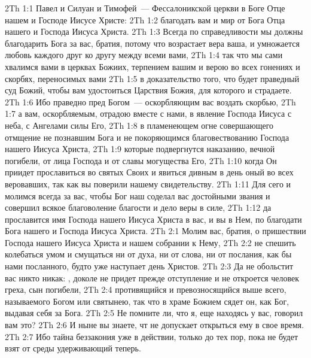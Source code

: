 \vs 2Th 1:1 Павел и Силуан и Тимофей~--- Фессалоникской церкви в Боге Отце нашем и Господе Иисусе Христе:
\vs 2Th 1:2 благодать вам и мир от Бога Отца нашего и Господа Иисуса Христа.
\rsbpar\vs 2Th 1:3 Всегда по справедливости мы должны благодарить Бога за вас, братия, потому что возрастает вера ваша, и умножается любовь каждого друг ко другу между всеми вами,
\vs 2Th 1:4 так что мы сами хвалимся вами в церквах Божиих, терпением вашим и верою во всех гонениях и скорбях, переносимых вами
\vs 2Th 1:5 в доказательство того, что будет праведный суд Божий, чтобы вам удостоиться Царствия Божия, для которого и страдаете.
\vs 2Th 1:6 Ибо праведно пред Богом~--- оскорбляющим вас воздать скорбью,
\vs 2Th 1:7 а вам, оскорбляемым, отрадою вместе с нами, в явление Господа Иисуса с неба, с Ангелами силы Его,
\vs 2Th 1:8 в пламенеющем огне совершающего отмщение не познавшим Бога и не покоряющимся благовествованию Господа нашего Иисуса Христа,
\vs 2Th 1:9 которые подвергнутся наказанию, вечной погибели, от лица Господа и от славы могущества Его,
\vs 2Th 1:10 когда Он приидет прославиться во святых Своих и явиться дивным в день оный во всех веровавших, так как вы поверили нашему свидетельству.
\vs 2Th 1:11 Для сего и молимся всегда за вас, чтобы Бог наш соделал вас достойными звания и совершил всякое благоволение благости и дело веры в силе,
\vs 2Th 1:12 да прославится имя Господа нашего Иисуса Христа в вас, и вы в Нем, по благодати Бога нашего и Господа Иисуса Христа.
\vs 2Th 2:1 Молим вас, братия, о пришествии Господа нашего Иисуса Христа и нашем собрании к Нему,
\vs 2Th 2:2 не спешить колебаться умом и смущаться ни от духа, ни от слова, ни от послания, как бы нами посланного, будто уже наступает день Христов.
\vs 2Th 2:3 Да не обольстит вас никто никак: , доколе не придет прежде отступление и не откроется человек греха, сын погибели,
\vs 2Th 2:4 противящийся и превозносящийся выше всего, называемого Богом или святынею, так что в храме Божием сядет он, как Бог, выдавая себя за Бога.
\vs 2Th 2:5 Не помните ли, что я, еще находясь у вас, говорил вам это?
\vs 2Th 2:6 И ныне вы знаете, чт не допускает открыться ему в свое время.
\vs 2Th 2:7 Ибо тайна беззакония уже в действии, только  до тех пор, пока не будет взят от среды удерживающий теперь.
